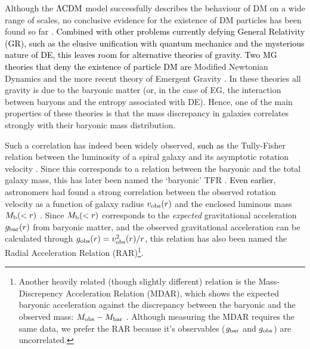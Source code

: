 \documentclass[usenatbib]{mnras}
\newcommand{\lcdm}{{\rm \Lambda CDM}}
\newcommand{\un}[1]{_{\rm #1}}
\begin{document}
Although the $\lcdm$ model successfully describes the behaviour of DM on a wide range of scales, no conclusive evidence for the existence of DM particles has been found so far \cite[despite years of enormous effort; for an overview, see][]{bertone2005,bertone2018}. \textcolor{black}{Combined with other problems currently defying General Relativity (GR), such as the elusive unification with quantum mechanics and the mysterious nature of DE, this leaves room for alternative theories of gravity. Two MG theories that deny the existence of particle DM are} Modified Newtonian Dynamics \cite[MOND,][]{milgrom1983} and the more recent theory of Emergent Gravity \cite[EG,][]{verlinde2016}. In these theories all gravity is due to the baryonic matter (or, in the case of EG, the interaction between baryons and the entropy associated with DE). Hence, one of the main properties of these theories is that the mass discrepancy in galaxies correlates strongly with their baryonic mass distribution.

Such a correlation has indeed been widely observed, \textcolor{black}{such as} the Tully-Fisher relation \cite[TFR,][]{tully1977} between the luminosity of a spiral galaxy and its asymptotic rotation velocity \cite[]{pierce1988,bernstein1994}. Since this corresponds to a relation between the baryonic and the total galaxy mass, this has later been named the `baryonic' TFR \cite[BTFR,][]{mcgaugh2000,mcgaugh2012}. \textcolor{black}{Even earlier}, astronomers had found a strong correlation between the observed rotation velocity as a function of galaxy radius $v\un{obs}(r)$ and the enclosed luminous mass \mbox{$M\un{b}(<r)$} \cite[]{sanders1986,sanders1996,mcgaugh2004,sanders2007,wu2015}. Since $M\un{b}(<r)$ corresponds to the \emph{expected} gravitational acceleration $g\un{bar}(r)$ from baryonic matter, and the observed gravitational acceleration can be calculated through $g\un{obs}(r)=v\un{obs}^2(r)/r$, this relation has also been named the Radial Acceleration Relation (RAR)\footnote{Another heavily related (though slightly different) relation is the Mass-Discrepency Acceleration Relation (MDAR), which shows the expected baryonic acceleration against the discrepancy between the baryonic and the observed mass: $M\un{obs}-M\un{bar}$ \cite[see][]{mcgaugh2004}. Although measuring the MDAR requires the same data, we prefer the RAR because it's observables ($g\un{bar}$ and $g\un{obs}$) are uncorrelated.}.
\end{document}
